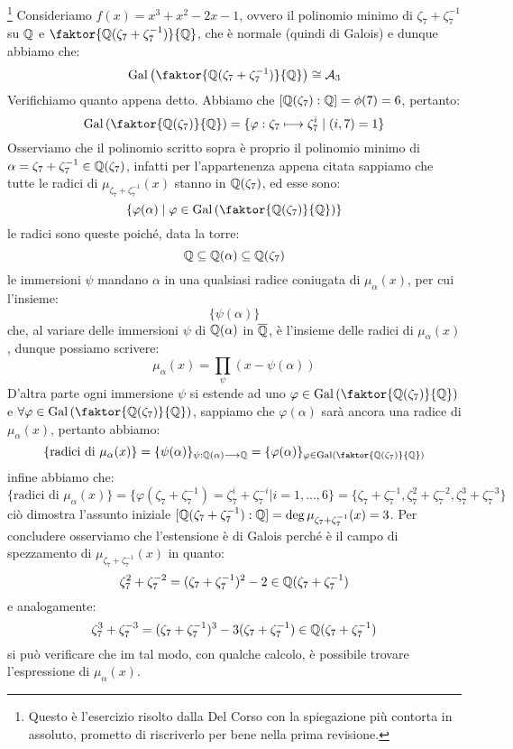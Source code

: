 \documentclass[11pt]{scrartcl}
\begin{document}
\begin{example}
\footnote{Questo è l'esercizio risolto dalla Del Corso con la spiegazione più contorta in assoluto, prometto di riscriverlo per bene nella prima revisione.}
Consideriamo $f(x) = x^3 + x^2 - 2x -1$, ovvero il polinomio minimo di $\zeta_7+\zeta_7^{-1}$ su $\mathbb Q$ e $\faktor{\QQ(\zeta_7+\zeta_7^{-1})}{\QQ}$, 
che è normale (quindi di Galois) e dunque abbiamo che:
\[ \Gal\left(\faktor{\QQ(\zeta_7+\zeta_7^{-1})}{\QQ}\right) \cong \mathcal{A}_3
    \]
Verifichiamo quanto appena detto. Abbiamo che $[\mathbb Q(\zeta_7) : \mathbb Q] = \phi(7) = 6$, pertanto:
\[ \Gal\left(\faktor{\QQ(\zeta_7)}{\QQ}\right) = \{\varphi : \zeta_7 \longmapsto \zeta_7^i \mid (i,7) = 1\}
    \]
Osserviamo che il polinomio scritto sopra è proprio il polinomio minimo di $\alpha = \zeta_7+\zeta_7^{-1} \in \mathbb Q(\zeta_7)$, infatti per l'appartenenza appena citata sappiamo che tutte le radici
di $\mu_{\zeta_7+\zeta_7^{-1}}(x)$ stanno in $\mathbb Q(\zeta_7)$, ed esse sono:
\[ \left\{\varphi(\alpha) \mid \varphi \in \Gal\left(\faktor{\QQ(\zeta_7)}{\QQ}\right) \right\}
    \]
le radici sono queste poiché, data la torre:
\[ \mathbb Q \subseteq \mathbb Q(\alpha) \subseteq \mathbb Q(\zeta_7)
    \]
le immersioni $\psi$ mandano $\alpha$ in una qualsiasi radice coniugata di $\mu_{\alpha}(x)$, per cui l'insieme:
\[ \{\psi(\alpha)\}
    \]
che, al variare delle immersioni $\psi$ di $\mathbb Q(\alpha)$ in $\overline {\mathbb Q}$, è l'insieme delle radici di $\mu_\alpha(x)$, dunque possiamo scrivere:
\[ \mu_\alpha(x) = \prod_{\psi}(x - \psi(\alpha))
    \]
D'altra parte ogni immersione $\psi$ si estende ad uno $\varphi \in \Gal\left(\faktor{\QQ(\zeta_7)}{\QQ}\right)$ e $\forall \varphi \in \Gal\left(\faktor{\QQ(\zeta_7)}{\QQ}\right)$, sappiamo che 
$\varphi(\alpha)$ sarà ancora una radice di $\mu_\alpha(x)$, pertanto abbiamo:
\[ \{\text{radici di $\mu_\alpha(x)$}\} = \{\psi(\alpha)\}_{\psi : \QQ(\alpha) \longrightarrow \QQ} = \{\varphi(\alpha)\}_{\varphi \in \Gal\left(\faktor{\QQ(\zeta_7)}{\QQ}\right)}
    \]
infine abbiamo che:
\[  \{\text{radici di $\mu_\alpha(x)$}\} = \{\varphi(\zeta_7+\zeta_7^{-1}) = \zeta_7^i+\zeta_7^{-i} | i = 1,\ldots,6\} = \{\zeta_7+\zeta_7^{-1}, \zeta_7^2+\zeta_7^{-2},\zeta_7^3+\zeta_7^{-3}\}
    \]
ciò dimostra l'assunto iniziale $[\mathbb Q(\zeta_7+\zeta_7^{-1}) : \mathbb Q] = \deg \mu_{\zeta_7+\zeta_7^{-1}}(x) = 3$. Per concludere osserviamo che l'estensione è di Galois perché è il campo di spezzamento di $\mu_{\zeta_7+\zeta_7^{-1}}(x)$ in quanto:
\[ \zeta_7^2+\zeta_7^{-2} = (\zeta_7+\zeta_7^{-1})^2 - 2 \in \mathbb Q(\zeta_7+\zeta_7^{-1})
    \]
e analogamente:
\[ \zeta_7^3+\zeta_7^{-3} = (\zeta_7+\zeta_7^{-1})^3 - 3(\zeta_7+\zeta_7^{-1}) \in \mathbb Q(\zeta_7+\zeta_7^{-1})
    \]
si può verificare che im tal modo, con qualche calcolo, è possibile trovare l'espressione di $\mu_\alpha(x)$.
\end{example}
\end{document}
